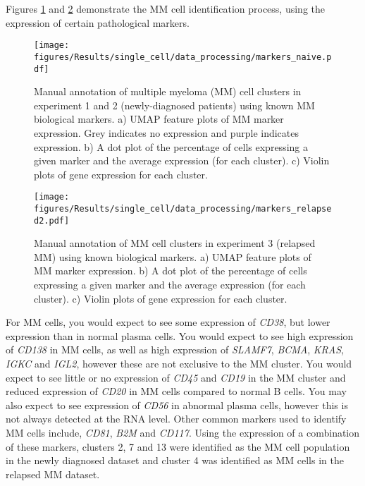 Figures \ref{fig:mm_markers_naive} and \ref{fig:mm_markers_relapsed} demonstrate the MM cell identification process, using the expression of certain pathological markers.
\begin{figure}[p]
    \centering
    \texttt{[image: figures/Results/single\_cell/data\_processing/markers\_naive.pdf]}
    \caption[MM cluster manual annotation- newly diagnosed MM]{Manual annotation of multiple myeloma (MM) cell clusters in experiment 1 and 2 (newly-diagnosed patients) using known MM biological markers.
    a) UMAP feature plots of MM marker expression.
    Grey indicates no expression and purple indicates expression.
    b) A dot plot of the percentage of cells expressing a given marker and the average expression (for each cluster).
    c) Violin plots of gene expression for each cluster.}
    \label{fig:mm_markers_naive}
\end{figure}
%
\begin{figure}[p]
    \centering
    \texttt{[image: figures/Results/single\_cell/data\_processing/markers\_relapsed2.pdf]}
    \caption[MM cluster manual annotation- relapsed MM]{Manual annotation of MM cell clusters in experiment 3 (relapsed MM) using known biological markers.
    a) UMAP feature plots of MM marker expression.
    b) A dot plot of the percentage of cells expressing a given marker and the average expression (for each cluster).
    c) Violin plots of gene expression for each cluster. }
    \label{fig:mm_markers_relapsed}
\end{figure}
%
For MM cells, you would expect to see some expression of \textit{CD38}, but lower expression than in normal plasma cells.
You would expect to see high expression of \textit{CD138} in MM cells, as well as high expression of \textit{SLAMF7}, \textit{BCMA}, \textit{KRAS}, \textit{IGKC} and \textit{IGL2}, however these are not exclusive to the MM cluster.
You would expect to see little or no expression of \textit{CD45} and \textit{CD19} in the MM cluster and reduced expression of \textit{CD20} in MM cells compared to normal B cells.
You may also expect to see expression of \textit{CD56} in abnormal plasma cells, however this is not always detected at the RNA level.
Other common markers used to identify MM cells include, \textit{CD81}, \textit{B2M} and \textit{CD117}.
Using the expression of a combination of these markers, clusters 2, 7 and 13 were identified as the MM cell population in the newly diagnosed dataset and cluster 4 was identified as MM cells in the relapsed MM dataset.

